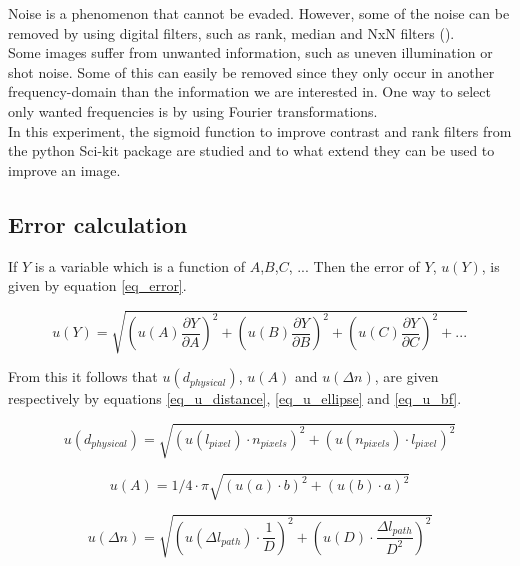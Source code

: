 Noise is a phenomenon that cannot be evaded. However, some of the noise can be removed by using digital filters, such as rank, median and NxN filters (\cite{tutorial}).\\
Some images suffer from unwanted information, such as uneven illumination or shot noise. Some of this can easily be removed since they only  occur in another frequency-domain than the information we are interested in. One way to select only wanted frequencies is by using Fourier transformations.\\
In this experiment, the sigmoid function to improve contrast and rank filters from the python Sci-kit package are studied and to what extend they can be used to improve an image.


\subsection{Error calculation}

If $Y$ is a variable which is a function of $A$,$B$,$C$, ... Then the error of $Y$, $u(Y)$, is given by equation \ref{eq_error}.

\begin{equation}
	\label{eq_error}
	u(Y) = \sqrt{\left(u(A) \frac{\partial Y}{\partial A}\right)^2 + \left(u(B) \frac{\partial Y}{\partial B}\right)^2 + \left(u(C) \frac{\partial Y}{\partial C}\right)^2 + ...}
\end{equation}

From this it follows that $u(d_{physical})$, $u(A)$ and $u(\Delta n)$, are given respectively by equations \ref{eq_u_distance}, \ref{eq_u_ellipse} and \ref{eq_u_bf}.

\begin{equation}
	\label{eq_u_distance}
	u(d_{physical}) = \sqrt{\left( u(l_{pixel}) \cdot n_{pixels} \right)^2 + \left( u(n_{pixels}) \cdot l_{pixel} \right)^2}
\end{equation}

\begin{equation}
	\label{eq_u_ellipse}
	u(A) = 1/4 \cdot \pi  \sqrt{(u(a) \cdot b)^2 + (u(b) \cdot a)^2}
\end{equation}

\begin{equation}
	\label{eq_u_bf}
	u(\Delta n) = \sqrt{\left( u(\Delta l_{path}) \cdot \frac{1}{D}\right)^2 + \left( u(D) \cdot \frac{\Delta l_{path}}{D^2}\right)^2}
\end{equation}
